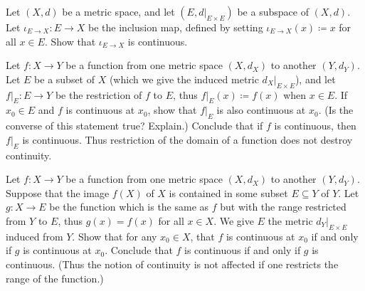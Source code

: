 \begin{exercise}\label{ex 2.1.5}
    Let \((X, d)\) be a metric space, and let \((E, d|_{E \times E})\) be a subspace of \((X, d)\).
    Let \(\iota_{E \to X} : E \to X\) be the inclusion map, defined by setting \(\iota_{E \to X}(x) \coloneqq x\) for all \(x \in E\).
    Show that \(\iota_{E \to X}\) is continuous.
\end{exercise}

\begin{exercise}\label{ex 2.1.6}
    Let \(f : X \to Y\) be a function from one metric space \((X, d_X)\) to another \((Y, d_Y)\).
    Let \(E\) be a subset of \(X\) (which we give the induced metric \(d_X|_{E \times E}\)), and let \(f|_E : E \to Y\) be the restriction of \(f\) to \(E\), thus \(f|_E(x) \coloneqq f(x)\) when \(x \in E\).
    If \(x_0 \in E\) and \(f\) is continuous at \(x_0\), show that \(f|_E\) is also continuous at \(x_0\).
    (Is the converse of this statement true? Explain.)
    Conclude that if \(f\) is continuous, then \(f|_E\) is continuous.
    Thus restriction of the domain of a function does not destroy continuity.
\end{exercise}

\begin{exercise}\label{ex 2.1.7}
    Let \(f : X \to Y\) be a function from one metric space \((X, d_X)\) to another \((Y, d_Y)\).
    Suppose that the image \(f(X)\) of \(X\) is contained in some subset \(E \subseteq Y\) of \(Y\).
    Let \(g : X \to E\) be the function which is the same as \(f\) but with the range restricted from \(Y\) to \(E\), thus \(g(x) = f(x)\) for all \(x \in X\).
    We give \(E\) the metric \(d_Y|_{E \times E}\) induced from \(Y\).
    Show that for any \(x_0 \in X\), that \(f\) is continuous at \(x_0\) if and only if \(g\) is continuous at \(x_0\).
    Conclude that \(f\) is continuous if and only if \(g\) is continuous.
    (Thus the notion of continuity is not affected if one restricts the range of the function.)
\end{exercise}